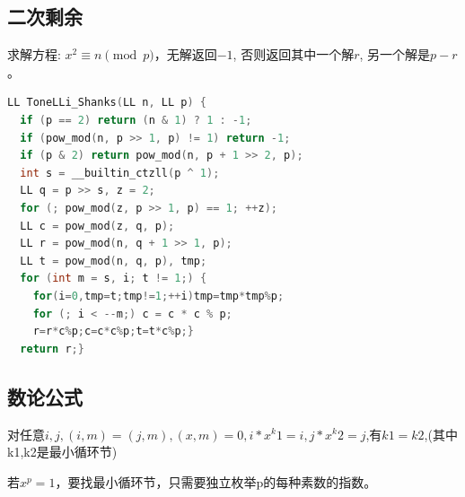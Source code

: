\documentclass[UTF8,a4paper,titlepage]{ctexart}
\begin{document}
\subsection{二次剩余}
求解方程: $x^2\equiv n\pmod{p}$，无解返回$-1$, 否则返回其中一个解$r$, 另一个解是$p-r$。\par
\begin{lstlisting}[language=C]
LL ToneLLi_Shanks(LL n, LL p) {
  if (p == 2) return (n & 1) ? 1 : -1;
  if (pow_mod(n, p >> 1, p) != 1) return -1;
  if (p & 2) return pow_mod(n, p + 1 >> 2, p);
  int s = __builtin_ctzll(p ^ 1);
  LL q = p >> s, z = 2;
  for (; pow_mod(z, p >> 1, p) == 1; ++z);
  LL c = pow_mod(z, q, p);
  LL r = pow_mod(n, q + 1 >> 1, p);
  LL t = pow_mod(n, q, p), tmp;
  for (int m = s, i; t != 1;) {
    for(i=0,tmp=t;tmp!=1;++i)tmp=tmp*tmp%p;
    for (; i < --m;) c = c * c % p;
    r=r*c%p;c=c*c%p;t=t*c%p;}
  return r;}
\end{lstlisting}

        \subsection{数论公式}
        对任意$i,j,(i,m)=(j,m),(x,m)=0,i*x^k1=i,j*x^k2=j$,有$k1=k2$,(其中k1,k2是最小循环节)\par
        若$x^p=1$，要找最小循环节，只需要独立枚举p的每种素数的指数。\par 
        
\end{document}

